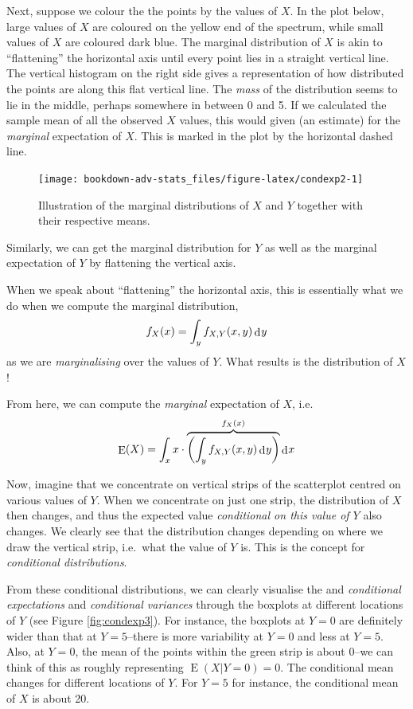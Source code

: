 \documentclass[
]{book}
\DeclareMathOperator{\E}{E}
\DeclareMathOperator{\dd}{d}
\newcommand{\dint}{\dd\hspace{0.5pt}\!}
\theoremstyle{definition}
\theoremstyle{definition}
\theoremstyle{definition}
\theoremstyle{definition}
\theoremstyle{remark}
\begin{document}
Next, suppose we colour the the points by the values of \(X\).
In the plot below, large values of \(X\) are coloured on the yellow end of the spectrum, while small values of \(X\) are coloured dark blue.
The marginal distribution of \(X\) is akin to ``flattening'' the horizontal axis until every point lies in a straight vertical line.
The vertical histogram on the right side gives a representation of how distributed the points are along this flat vertical line.
The \emph{mass} of the distribution seems to lie in the middle, perhaps somewhere in between 0 and 5.
If we calculated the sample mean of all the observed \(X\) values, this would given (an estimate) for the \emph{marginal} expectation of \(X\).
This is marked in the plot by the horizontal dashed line.

\begin{figure}

{\centering \texttt{[image: bookdown-adv-stats\_files/figure-latex/condexp2-1]} 

}

\caption{Illustration of the marginal distributions of \(X\) and \(Y\) together with their respective means.}\label{fig:condexp2}
\end{figure}

Similarly, we can get the marginal distribution for \(Y\) as well as the marginal expectation of \(Y\) by flattening the vertical axis.

When we speak about ``flattening'' the horizontal axis, this is essentially what we do when we compute the marginal distribution,
\[
f_X(x) = \int_y f_{X,Y}(x,y) \dint y
\]
as we are \emph{marginalising} over the values of \(Y\).
What results is the distribution of \(X\)!

From here, we can compute the \emph{marginal} expectation of \(X\), i.e.
\[
\E(X) = \int_x x \cdot \overbrace{\left( \int_y f_{X,Y}(x,y) \dint y \right)}^{f_X(x)} \dint x
\]

Now, imagine that we concentrate on vertical strips of the scatterplot centred on various values of \(Y\).
When we concentrate on just one strip, the distribution of \(X\) then changes, and thus the expected value \emph{conditional on this value of \(Y\)} also changes.
We clearly see that the distribution changes depending on where we draw the vertical strip, i.e.~what the value of \(Y\) is.
This is the concept for \emph{conditional distributions}.

From these conditional distributions, we can clearly visualise the and \emph{conditional expectations} and \emph{conditional variances} through the boxplots at different locations of \(Y\) (see Figure \ref{fig:condexp3}).
For instance, the boxplots at \(Y=0\) are definitely wider than that at \(Y=5\)--there is more variability at \(Y=0\) and less at \(Y=5\).
Also, at \(Y=0\), the mean of the points within the green strip is about 0--we can think of this as roughly representing \(\E(X|Y=0)=0\).
The conditional mean changes for different locations of \(Y\).
For \(Y=5\) for instance, the conditional mean of \(X\) is about 20.
\end{document}
